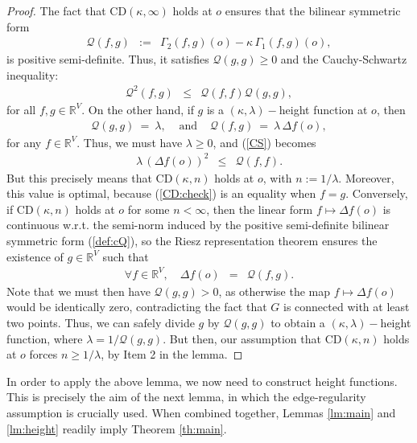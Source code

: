 \documentclass[10pt,a4paper]{amsart}
\newcommand{\cQ}{\mathcal {Q}}
\newcommand{\dR}{\mathbb {R}}
\newcommand{\CD}{\mathrm{CD}}
\begin{document}
\begin{proof}
The fact that $\CD(\kappa,\infty)$ holds at $o$ ensures that the bilinear symmetric form
\begin{eqnarray}
\label{def:cQ}
\cQ(f,g) & := & \Gamma_2(f,g)(o)-\kappa\,\Gamma_1(f,g)(o),
\end{eqnarray}
is positive semi-definite. Thus, it satisfies $\cQ(g,g)\ge 0$ and the Cauchy-Schwartz inequality:
\begin{eqnarray}
\label{CS}
\cQ^2(f,g) & \le & \cQ(f,f)\cQ(g,g),
\end{eqnarray}
for all $f,g\in \dR^V$. On the other hand, if $g$ is a $(\kappa,\lambda)-$height function at $o$, then
\begin{eqnarray*}
\cQ(g,g) \ = \ \lambda, & \textrm{ and } & \cQ(f,g) \ = \ \lambda\,\Delta f(o),
\end{eqnarray*}
for any $f\in \dR^V$. Thus, we must have $\lambda\ge 0$, and (\ref{CS}) becomes
\begin{eqnarray}
\label{CD:check}
\lambda\, \left(\Delta f(o)\right)^2 & \le & \cQ(f,f).
\end{eqnarray}
But this precisely means that $\CD(\kappa,n)$ holds at $o$, with $n:=1/\lambda$. Moreover, this value is optimal, because (\ref{CD:check}) is an equality when $f=g$. Conversely, if $\CD(\kappa,n)$ holds at $o$ for some $n<\infty$, then the linear form $f\mapsto \Delta f(o)$ is continuous w.r.t. the semi-norm induced by the positive semi-definite  bilinear symmetric form (\ref{def:cQ}), so the Riesz representation theorem ensures the existence of $g\in\dR^V$ such that 
\begin{eqnarray}
\forall f\in\dR^V,\quad \Delta f(o) & = & \cQ(f,g).
\end{eqnarray}
Note that we must then have $\cQ(g,g)>0$, as otherwise the map $f\mapsto \Delta f(o)$  would be identically zero, contradicting the fact that $G$ is connected  with at least two points. Thus, we can safely divide $g$ by $\cQ(g,g)$ to obtain a $(\kappa,\lambda)-$height function, where $\lambda=1/\cQ(g,g)$. But then, our assumption that  $\CD(\kappa,n)$ holds at $o$ forces $n\ge 1/\lambda$, by Item 2 in the lemma.
\end{proof}

In order to apply the above lemma, we now need to construct height functions. This is precisely the aim of the next lemma, in which the edge-regularity assumption is crucially used. 
When combined together, Lemmas \ref{lm:main} and \ref{lm:height} readily imply Theorem \ref{th:main}.   
\end{document}
